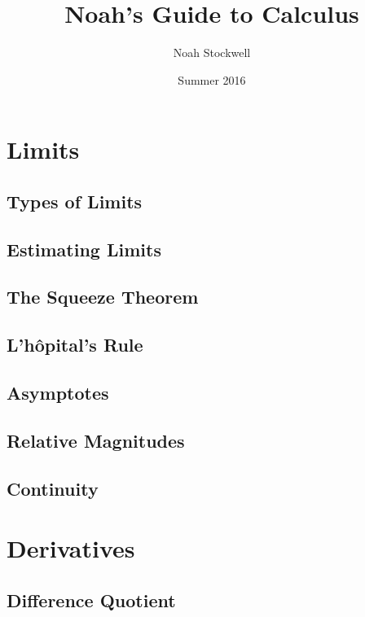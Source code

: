 \documentclass{article}
\title{Noah's Guide to Calculus}
\author{Noah Stockwell}
\date{Summer 2016}
\begin{document}
\maketitle
\vspace{2in}
\begin{center}\end{center}
\newpage
\tableofcontents
\newpage

\section{Limits} \newpage
\subsection{Types of Limits}  \newpage
\subsection{Estimating Limits}
\subsection{The Squeeze Theorem}
\subsection{L'h\^{o}pital's Rule}
\subsection{Asymptotes}
\subsection{Relative Magnitudes}
\subsection{Continuity}

\section{Derivatives}
\subsection{Difference Quotient}
\end{document}
